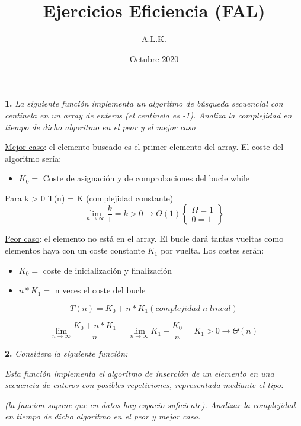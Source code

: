 \documentclass{article}
\title{Ejercicios Eficiencia (FAL)}
\author{A.L.K.}
\date{Octubre 2020}
\begin{document}
\maketitle
\newpage


\textbf{1.} \textit{La siguiente función implementa un algoritmo de búsqueda secuencial con centinela en un array de enteros (el centinela es -1). Analiza la complejidad en tiempo de dicho algoritmo en el peor y el mejor caso}
\begin{figure}[H]
    \centering
    
\end{figure}

\underline{Mejor caso}: el elemento buscado es el primer elemento del array.
El coste del algoritmo sería:
\begin{itemize}
    \item $K_{0} =$ Coste de asignación y de comprobaciones del bucle while
\end{itemize}
Para k > 0 T(n) = K (complejidad constante)
\[
    \lim_{n \rightarrow \infty} \frac{k}{1} = k > 0 \rightarrow \Theta(1)\left\{\begin{array}{l}
        \Omega = 1 \\
        0 = 1
    \end{array}\right\}
\]

\underline{Peor caso}: el elemento no está en el array. El bucle dará tantas vueltas como elementos haya con un coste constante $K_{1}$ por vuelta.
Los costes serán:
\begin{itemize}
    \item $K_{0} = $ coste de inicialización y finalización
    \item $n* K_{1} = $ n veces el coste del bucle
\end{itemize}

\[
    T(n) = K_{0} + n * K_{1} (complejidad \; n \; lineal)
\]

\[
    \lim_{n \rightarrow \infty} \frac{K_{0} + n * K_{1}}{n} = \lim_{n \rightarrow \infty} K_{1} + \frac{K_{0}}{n } = K_{1} > 0 \rightarrow \Theta (n)
\]

\textbf{2.} \textit{Considera la siguiente función:}

\begin{figure}[H]
    \centering
    
\end{figure}

\textit{Esta función implementa el algoritmo de inserción de un elemento en una secuencia de enteros con posibles repeticiones, representada mediante el tipo:}
\begin{figure}[H]
    \centering
    
\end{figure}
\textit{(la funcion supone que en datos hay espacio suficiente). Analizar la complejidad en tiempo de dicho algoritmo en el peor y mejor caso.}
\newpage
\end{document}
